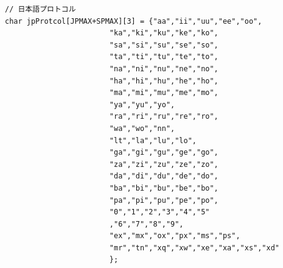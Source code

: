 \documentclass[a4j]{jarticle}
\begin{document}
  \begin{lstlisting}[basicstyle=\ttfamily\footnotesize, frame=single,label=jpProtcolarray,caption=jpProtcol配列]
// 日本語プロトコル
char jpProtcol[JPMAX+SPMAX][3] = {"aa","ii","uu","ee","oo",
                        "ka","ki","ku","ke","ko",
                        "sa","si","su","se","so",
                        "ta","ti","tu","te","to",
                        "na","ni","nu","ne","no",
                        "ha","hi","hu","he","ho",
                        "ma","mi","mu","me","mo",
                        "ya","yu","yo",
                        "ra","ri","ru","re","ro",
                        "wa","wo","nn",
                        "lt","la","lu","lo",
                        "ga","gi","gu","ge","go",
                        "za","zi","zu","ze","zo",
                        "da","di","du","de","do",
                        "ba","bi","bu","be","bo",
                        "pa","pi","pu","pe","po",
                        "0","1","2","3","4","5"
                        ,"6","7","8","9",
                        "ex","mx","ox","px","ms","ps",
                        "mr","tn","xq","xw","xe","xa","xs","xd"
                        };

  \end{lstlisting} 
  
\end{document}
